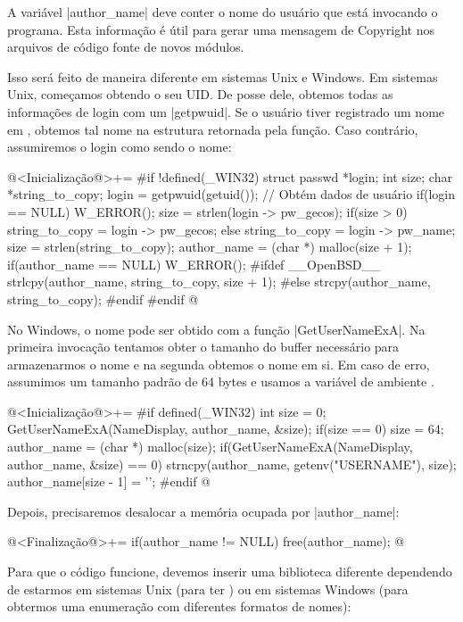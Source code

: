 {

A variável |author_name| deve conter o nome do usuário que está
invocando o programa. Esta informação é útil para gerar uma mensagem
de Copyright nos arquivos de código fonte de novos módulos.

Isso será feito de maneira diferente em sistemas Unix e Windows. Em
sistemas Unix, começamos obtendo o seu UID. De posse dele, obtemos
todas as informações de login com um |getpwuid|. Se o usuário tiver
registrado um nome em , obtemos tal nome na
estrutura retornada pela função. Caso contrário, assumiremos o login
como sendo o nome:

\iniciocodigo
@<Inicialização@>+=
#if !defined(_WIN32)
{
  struct passwd *login;
  int size;
  char *string_to_copy;
  login = getpwuid(getuid()); // Obtém dados de usuário
  if(login == NULL) W_ERROR();
  size = strlen(login -> pw_gecos);
  if(size > 0)
    string_to_copy = login -> pw_gecos;
  else
    string_to_copy = login -> pw_name;
  size = strlen(string_to_copy);
  author_name = (char *) malloc(size + 1);
  if(author_name == NULL) W_ERROR();
#ifdef __OpenBSD__
  strlcpy(author_name, string_to_copy, size + 1);
#else
  strcpy(author_name, string_to_copy);
#endif
}
#endif
@
\fimcodigo

No Windows, o nome pode ser obtido com a função |GetUserNameExA|. Na
primeira invocação tentamos obter o tamanho do buffer necessário para
armazenarmos o nome e na segunda obtemos o nome em si. Em caso de
erro, assumimos um tamanho padrão de 64 bytes e usamos a variável de
ambiente .

\iniciocodigo
@<Inicialização@>+=
#if defined(_WIN32)
{
  int size = 0;
  GetUserNameExA(NameDisplay, author_name, &size);
  if(size == 0)
    size = 64;
  author_name = (char *) malloc(size);
  if(GetUserNameExA(NameDisplay, author_name, &size) == 0){
    strncpy(author_name, getenv("USERNAME"), size);
    author_name[size - 1] = '\0';
  }
}
#endif
@
\fimcodigo

Depois, precisaremos desalocar a memória ocupada por |author_name|:

\iniciocodigo
@<Finalização@>+=
if(author_name != NULL) free(author_name);
@
\fimcodigo

Para que o código funcione, devemos inserir uma biblioteca diferente
dependendo de estarmos em sistemas Unix (para
ter ) ou em sistemas Windows (para obtermos uma
enumeração com diferentes formatos de nomes):

}
